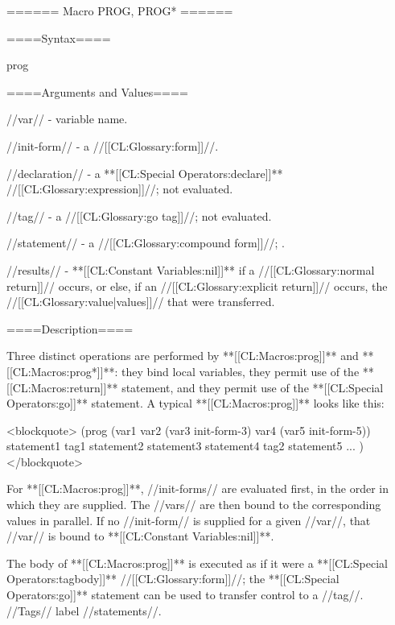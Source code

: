 ====== Macro PROG, PROG* ======

====Syntax====

\DefmacWithValuesNewline prog {  } {}

 {  } {}

====Arguments and Values====

//var// - variable name.

//init-form// - a //[[CL:Glossary:form]]//.

//declaration// - a **[[CL:Special Operators:declare]]** //[[CL:Glossary:expression]]//; not evaluated.

//tag// - a //[[CL:Glossary:go tag]]//; not evaluated.

//statement// - a //[[CL:Glossary:compound form]]//; \evalspecial.

//results// - **[[CL:Constant Variables:nil]]** if a //[[CL:Glossary:normal return]]// occurs, or else, if an //[[CL:Glossary:explicit return]]// occurs, the //[[CL:Glossary:value|values]]// that were transferred.

====Description====

Three distinct operations are performed by **[[CL:Macros:prog]]** and **[[CL:Macros:prog*]]**: they bind local variables, they permit use of the **[[CL:Macros:return]]** statement, and they permit use of the **[[CL:Special Operators:go]]** statement. A typical **[[CL:Macros:prog]]** looks like this:

<blockquote> (prog (var1 var2 (var3 init-form-3) var4 (var5 init-form-5))  statement1 tag1 statement2 statement3 statement4 tag2 statement5 ... ) </blockquote>

For **[[CL:Macros:prog]]**, //init-forms// are evaluated first, in the order in which they are supplied. The //vars// are then bound to the corresponding values in parallel. If no //init-form// is supplied for a given //var//, that //var// is bound to **[[CL:Constant Variables:nil]]**.

The body of **[[CL:Macros:prog]]** is executed as if it were a **[[CL:Special Operators:tagbody]]** //[[CL:Glossary:form]]//; the **[[CL:Special Operators:go]]** statement can be used to transfer control to a //tag//. //Tags// label //statements//.

